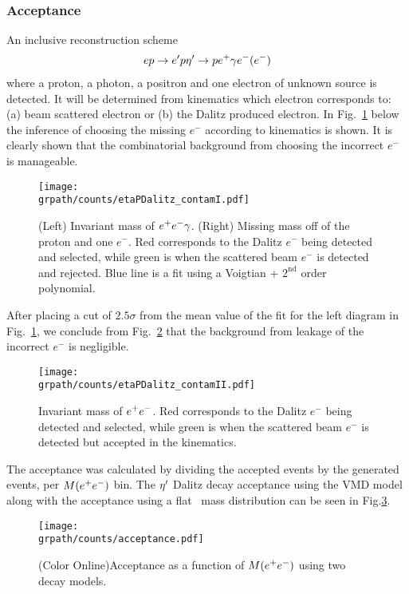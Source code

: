 \subsubsection{Acceptance}\label{sec.reconstruction}
An inclusive reconstruction scheme
\begin{align}
ep\to e'p \eta^{\prime} \rightarrow p e^+ \gamma e^- (e^-)
\end{align}
where a proton, a photon, a positron and one electron of unknown source is detected. It will be determined from kinematics which electron corresponds to: (a) beam scattered electron or (b) the Dalitz produced electron. In Fig.~\ref{fig:recon} below the inference of choosing the missing $e^-$ according to kinematics is shown. It is clearly shown that the combinatorial  background from choosing the incorrect $e^-$ is manageable.
\begin{figure}[h!]\begin{center}
		\texttt{[image: \\grpath/counts/etaPDalitz\_contamI.pdf]}
		\caption[Reconstrcution with FASTMC]{\label{fig:recon}{(Left) Invariant mass of $e^+e^- \gamma$. (Right) Missing mass off of the proton and one $e^-$.  Red corresponds to the Dalitz $e^-$ being detected and selected, while green is when the scattered beam $e^-$ is detected and rejected. Blue line is a fit using a Voigtian + $2^{\mathrm{nd}}$ order polynomial.}}
	\end{center}\end{figure}
	\FloatBarrier
After placing a cut of $2.5\sigma$ from the mean value of the fit for the left diagram in Fig.~\ref{fig:recon}, we conclude from Fig.~\ref{fig:recondalitz} that the background from leakage of the incorrect $e^-$ is negligible.
\begin{figure}[h!]\begin{center}
		\texttt{[image: \\grpath/counts/etaPDalitz\_contamII.pdf]}
		\caption[Reconstrcution with FASTMC]{\label{fig:recondalitz}{Invariant mass of $e^+e^-$.  Red corresponds to the Dalitz $e^-$ being detected and selected, while green is when the scattered beam $e^-$ is detected but accepted in the kinematics.}}
	\end{center}\end{figure}
	\FloatBarrier
The acceptance was calculated by dividing the accepted events by the generated events, per $M(\epem)$ bin. The $\eta^{\prime}$ Dalitz decay acceptance using the VMD model along with the acceptance using a flat \epemT \ mass distribution can be seen in Fig.\ref{fig:VMDaccepted}.
\begin{figure}[h!]\begin{center}
		\texttt{[image: \\grpath/counts/acceptance.pdf]}
		\caption[Acceptance as a function of $M(\epem)$]{\label{fig:VMDaccepted}{(Color Online)Acceptance as a function of $M(\epem)$ using two decay models.}}
	\end{center}\end{figure}
\FloatBarrier

